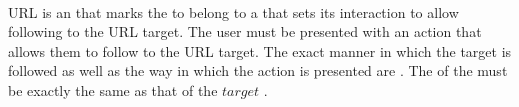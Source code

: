  \\

URL is an  that marks the  to belong to a  that sets its interaction to allow following to the URL target. The user must be presented with an action that allows them to follow to the URL target. The exact manner in which the target is followed as well as the way in which the action is presented are . The  of the  must be exactly the same as that of the \inline$target$ .\\

\begin{examples}
\end{examples}

